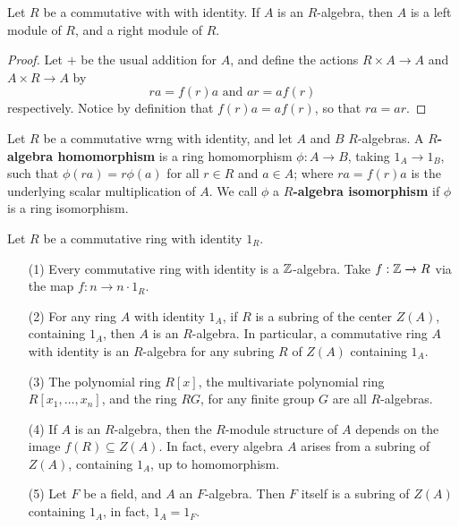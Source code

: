 \begin{lemma}\label{lemma_4.1.3}
    Let $R$ be a commutative with with identity. If  $A$ is an $R$-algebra,
    then $A$ is a left module of $R$, and a right module of $R$.
\end{lemma}
\begin{proof}
    Let $+$ be the usual addition for $A$, and define the actions $R \times A
    \xrightarrow{} A$ and $A \times R \xrightarrow{} A$ by
    \begin{equation*}
        ra=f(r)a \text{ and } ar=af(r)
    \end{equation*}
    respectively. Notice by definition that $f(r)a=af(r)$, so that $ra=ar$.
\end{proof}

\begin{definition}
    Let $R$ be a commutative wrng with identity, and let $A$ and  $B$
    $R$-algebras. A  \textbf{$R$-algebra homomorphism} is a ring homomorphism
    $\phi:A \xrightarrow{} B$, taking $1_A \xrightarrow{} 1_B$, such that
    $\phi(ra)=r\phi(a)$ for all $r \in R$ and  $a \in A$; where  $ra=f(r)a$ is
    the underlying scalar multiplication of $A$. We call $\phi$ a
    \textbf{$R$-algebra isomorphism} if $\phi$ is a ring isomorphism.
\end{definition}

\begin{example}\label{}
    Let $R$ be a commutative ring with identity  $1_R$.
    \begin{enumerate}
        \item[(1)] Every commutative ring with identity is a $\mathbb{Z}$-algebra. Take
            $f:\mathbb{Z} \xrightarrow{} R$ via the map $f:n \xrightarrow{} n \cdot
            1_R$.

        \item[(2)] For any ring $A$ with identity  $1_A$, if  $R$ is a subring
            of the center  $Z(A)$, containing $1_A$, then $A$ is an
            $R$-algebra. In particular, a commutative ring  $A$ with identity is
            an  $R$-algebra for any subring  $R$ of  $Z(A)$ containing $1_A$.

        \item[(3)] The polynomial ring $R[x]$, the multivariate polynomial ring
            $R[x_1, \dots, x_n]$, and the ring $RG$, for any finite group  $G$
            are all  $R$-algebras.

        \item[(4)] If $A$ is an  $R$-algebra, then the  $R$-module structure of
             $A$ depends on the image  $f(R) \subseteq Z(A)$. In fact, every
             algebra  $A$ arises from a subring of  $Z(A)$, containing $1_A$, up
             to homomorphism.

         \item[(5)] Let $F$ be a field, and $A$ an  $F$-algebra. Then $F$ itself
             is a subring of $Z(A)$ containing $1_A$, in fact,  $1_A=1_F$.
    \end{enumerate}
\end{example}

